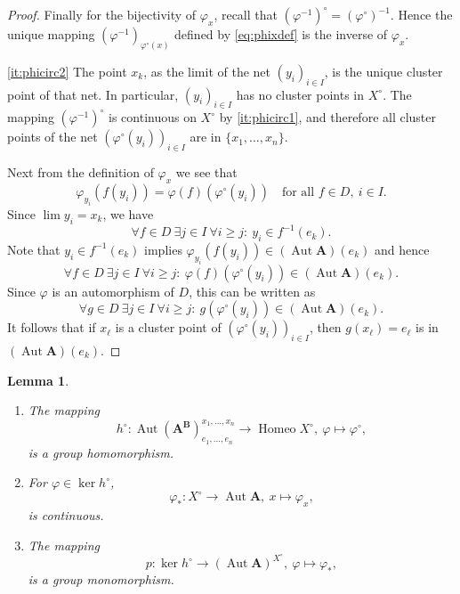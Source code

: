 \documentclass[12pt,a4paper,reqno]{amsart}
\numberwithin{equation}{section}
\theoremstyle{plain}
\newtheorem{lem}[thm]{Lemma}
\theoremstyle{definition}
\newcommand{\A}{\mathbf{A}}
\newcommand{\ABxe}{(\mathbf{A^B})^{x_1,\dots,x_n}_{e_1,\dots,e_n}}
\DeclareMathOperator{\Aut}{Aut}
\DeclareMathOperator{\Homeo}{Homeo}
\begin{document}
\begin{proof}
 Finally for the bijectivity of $\varphi_x$, recall that $(\varphi^{-1})^\circ = (\varphi^\circ)^{-1}$. 
 Hence the unique mapping $(\varphi^{-1})_{\varphi^\circ(x)}$ defined by \eqref{eq:phixdef} is the inverse of $\varphi_x$.

 
\eqref{it:phicirc2} 
 The point $x_k$, as the limit of the net $(y_i)_{i\in I}$, is the unique cluster point of that net.
In particular, $(y_i)_{i\in I}$ has no cluster points in $X^\circ$. 
 The mapping $(\varphi^{-1})^\circ$ is continuous on $X^\circ$ by \eqref{it:phicirc1}, and therefore
 all cluster points of the net $(\varphi^\circ(y_i))_{i\in I}$ are in $\{x_1,\dots,x_n\}$.

 Next from the definition of $\varphi_x$ 
 we see that 
\[
\varphi_{y_i}(f(y_i))=\varphi(f)(\varphi^\circ(y_i))\quad
\text{for all } f\in D,\ i\in I.
\]
 Since $\lim y_i=x_k$, we have
\[
\forall f\in D\ \exists j\in I\ \forall i\geq j :\
y_i\in f^{-1}(e_k).
\]
Note that
$y_i\in f^{-1}(e_k)$ implies $\varphi_{y_i}(f(y_i))\in (\Aut\A)(e_k)$
and hence 
\[
\forall f\in D\ \exists j\in I\ \forall i\geq j:\:
\varphi(f)(\varphi^\circ(y_i)) \in (\Aut\A)(e_k).
\]
Since $\varphi$ is an automorphism of $D$, this can be written as
\[ \forall g\in D\ \exists j\in I\ \forall i\geq j:\:
g(\varphi^\circ(y_i)) \in (\Aut\A)(e_k). \]
 It follows that if $x_\ell$ is a cluster point of $(\varphi^\circ(y_i))_{i\in I}$,
 then $g(x_\ell) = e_\ell$ is in $(\Aut\A)(e_k)$.
\end{proof}


\begin{lem} \label{la:ppohom} \mbox{}
\begin{enumerate}
\item  \label{it:h0}    
 The mapping
 \[ h^\circ\colon\Aut\ABxe\rightarrow\Homeo X^\circ,\ \varphi\mapsto\varphi^\circ, \]
 is a group homomorphism.
\item \label{it:kerh0}
 For $\varphi\in\ker h^\circ$,
 \[ \varphi_*\colon X^\circ\to\Aut\A,\ x\mapsto \varphi_x, \] 
 is continuous.
\item \label{it:K0}
 The mapping
\[ p\colon\ker h^\circ \to (\Aut\A)^{X^\circ},\ \varphi\mapsto \varphi_*, \]
 is a group monomorphism.   
\end{enumerate}
\end{lem}
\end{document}
